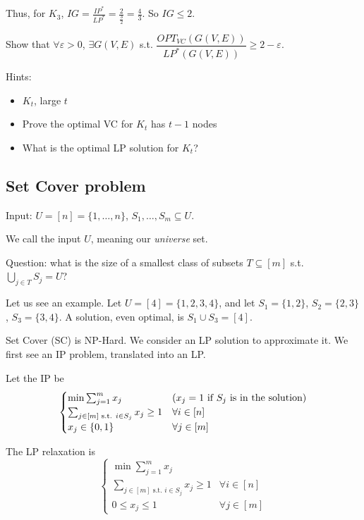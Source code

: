     Thus, for $K_3$, $IG = \frac{IP^*}{LP^*} = \frac{2}{\frac{3}{2}} = \frac{4}{3}$. So $IG \leq 2$.

    \begin{exercise}
        Show that $\forall \varepsilon > 0$, $\exists G(V,E)$ s.t. $\dfrac{OPT_{VC}(G(V,E))}{LP^*(G(V,E))} \geq 2 - \varepsilon$.

        Hints:
        \begin{itemize}
            \item $K_t$, large $t$
            \item Prove the optimal VC for $K_t$ has $t-1$ nodes
            \item What is the optimal LP solution for $K_t$?
        \end{itemize}
    \end{exercise}


\subsection{Set Cover problem} \label{subsect:setcover}

    Input: $U = [n] = \{ 1, \dots, n \}$, $S_1, \dots, S_m \subseteq U$.

    We call the input $U$, meaning our \textit{universe} set.

    Question: what is the size of a smallest class of subsets $T \subseteq [m]$ s.t. $\bigcup_{j \in T} S_j = U$?

    Let us see an example. Let $U = [4] = \{ 1,2,3,4 \}$, and let $S_1 = \{ 1,2 \}$, $S_2 = \{ 2,3 \}$, $S_3 = \{ 3,4 \}$.
    A solution, even optimal, is $S_1 \cup S_3 = [4]$.

    Set Cover (SC) is NP-Hard. We consider an LP solution to approximate it. We first see an IP problem, translated into an LP.

    Let the IP be
    \begin{equation}
        \begin{cases}
            \min \sum_{j=1}^m x_j                               & (x_j = 1 \text{ if } S_j \text{ is in the solution})\\
            \sum_{j \in [m] \text{ s.t. } i \in S_j} x_j \geq 1 & \forall i \in [n]\\
            x_j \in \{ 0,1 \}                                          & \forall j \in [m]
        \end{cases}
    \end{equation}

    The LP relaxation is
    \begin{equation}
        \begin{cases}
            \min \sum_{j=1}^m x_j                               \\
            \sum_{j \in [m] \text{ s.t. } i \in S_j} x_j \geq 1 & \forall i \in [n]\\
            0 \leq x_j \leq 1                                   & \forall j \in [m]
        \end{cases}
    \end{equation}

